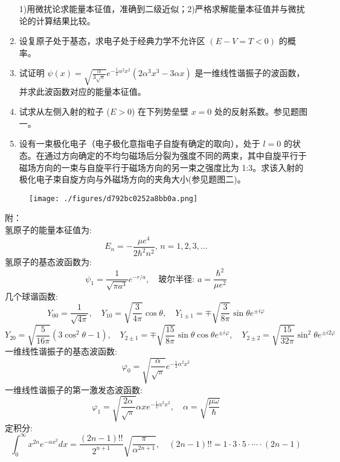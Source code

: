 \begin{enumerate}
    1)用微扰论求能量本征值，准确到二级近似；2)严格求解能量本征值并与微扰论的计算结果比较。\\
    \item 设复原子处于基态，求电子处于经典力学不允许区 $(E - V = T < 0)$ 的概率。
    \item 试证明 $\psi(x) = \sqrt{\frac{\alpha}{3\sqrt{\pi}}} e^{-\frac{1}{2}\alpha^2 x^2} (2\alpha^3 x^3 - 3\alpha x)$ 是一维线性谐振子的波函数，并求此波函数对应的能量本征值。
    \item 试求从左侧入射的粒子 ($E > 0$) 在下列势垒壁 $x = 0$ 处的反射系数。参见题图一。
    \item 设有一束极化电子（电子极化意指电子自旋有确定的取向），处于 $l = 0$ 的状态。在通过方向确定的不均匀磁场后分裂为强度不同的两束，其中自旋平行于磁场方向的一束与自旋平行于磁场方向的另一束之强度比为 1:3。求该入射的极化电子束自旋方向与外磁场方向的夹角大小(参见题图二)。
\end{enumerate}
\begin{figure}[ht]
\centering
\texttt{[image: ./figures/d792bc0252a8bb0a.png]}
\caption{} \label{fig_NJUST4_1}
\end{figure}
附：\\
氢原子的能量本征值为:
\[E_n = -\frac{\mu e^4}{2\hbar^2 n^2}, \, n=1,2,3,\ldots~\]
氢原子的基态波函数为:\[\psi_1 = \frac{1}{\sqrt{\pi a^3}} e^{-r/a}, \quad \text{玻尔半径: } a = \frac{\hbar^2}{\mu e^2}~\]
几个球谐函数:\[Y_{00} = \frac{1}{\sqrt{4\pi}}, \quad Y_{10} = \sqrt{\frac{3}{4\pi}} \cos \theta, \quad Y_{1\pm1} = \mp \sqrt{\frac{3}{8\pi}} \sin \theta e^{\pm i\varphi}~\]
\[Y_{20} = \sqrt{\frac{5}{16\pi}} (3\cos^2 \theta - 1), \quad Y_{2\pm1} = \mp \sqrt{\frac{15}{8\pi}} \sin \theta \cos \theta e^{\pm i\varphi}, \quad Y_{2\pm2} = \sqrt{\frac{15}{32\pi}} \sin^2 \theta e^{\pm i 2\varphi}~\]
一维线性谐振子的基态波函数:\[\varphi_0 = \sqrt{\frac{\alpha}{\sqrt{\pi}}} e^{-\frac{1}{2} \alpha^2 x^2}~\]
一维线性谐振子的第一激发态波函数:\[\varphi_1 = \sqrt{\frac{2\alpha}{\sqrt{\pi}}} \alpha x e^{-\frac{1}{2} \alpha^2 x^2}, \quad \alpha = \sqrt{\frac{\mu \omega}{\hbar}}~\]
定积分:\[\int_{0}^{\infty} x^{2n} e^{-\alpha x^2} dx = \frac{(2n-1)!!}{2^{n+1}} \sqrt{\frac{\pi}{\alpha^{2n+1}}}, \quad (2n-1)!! = 1 \cdot 3 \cdot 5 \cdot \cdots \cdot (2n-1)~\]